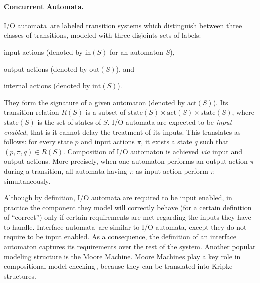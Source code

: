 \paragraph{Concurrent Automata.}
%
I/O automata\,\cite{lynch1988ioautomata} are labeled transition systems which
distinguish between three classes of transitions, modeled with three disjoints
sets of labels:
%
\begin{inparaenum}[(1)]
\item input actions (denoted by \( \mathrm{in}(S) \) for an automaton \( S \)),
\item output actions (denoted by \( \mathrm{out}(S) \)), and
\item internal actions (denoted by \( \mathrm{int}(S) \)).
\end{inparaenum}
%
They form the signature of a given automaton (denoted by
\( \mathrm{act}(S) \)).
%
Its transition relation \( R(S) \) is a subset of
\( \mathrm{state}(S) \times \mathrm{act}(S) \times \mathrm{state}(S) \), where
\( \mathrm{state}(S) \) is the set of states of \( S \).
%
I/O automata are expected to be \emph{input enabled}, that is it cannot delay
the treatment of its inputs.
%
This translates as follows: for every state \( p \) and input actions \( \pi \),
it exists a state \( q \) such that \( (p, \pi, q) \in R(S) \).
%
Composition of I/O automaton is achieved \emph{via} input and output actions.
%
More precisely, when one automaton performs an output action \( \pi \) during a
transition, all automata having \( \pi \) as input action perform \( \pi \)
simultaneously.

Although by definition, I/O automata are required to be input enabled, in
practice the component they model will correctly behave (for a certain
definition of ``correct'') only if certain requirements are met regarding the
inputs they have to handle.
%
Interface automata\,\cite{de2001interfaceautomata} are similar to I/O automata,
except they do not require to be input enabled.
%
As a consequence, the definition of an interface automaton captures its
requirements over the rest of the system.
%
Another popular modeling structure is the Moore Machine.
%
Moore Machines play a key role in compositional model
checking\,\cite{mcmillan1989compositional}, because they can be translated into
Kripke structures.

